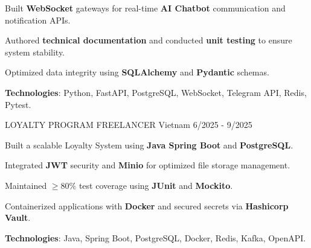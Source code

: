 \begin{cventries}
{\begin{cvitems}
        \item {Built \textbf{WebSocket} gateways for real-time \textbf{AI Chatbot} communication and notification APIs.}
        \item {Authored \textbf{technical documentation} and conducted \textbf{unit testing} to ensure system stability.}
        \item {Optimized data integrity using \textbf{SQLAlchemy} and \textbf{Pydantic} schemas.}
        \item {\textbf{Technologies}: Python, FastAPI, PostgreSQL, WebSocket, Telegram API, Redis, Pytest.}
      \end{cvitems}
    }

  \cventry
    {LOYALTY PROGRAM}
    {FREELANCER}
    {Vietnam}
    {6/2025 - 9/2025}
    {
      \begin{cvitems}
        \item {Built a scalable Loyalty System using \textbf{Java Spring Boot} and \textbf{PostgreSQL}.}
        \item {Integrated \textbf{JWT} security and \textbf{Minio} for optimized file storage management.}
        \item {Maintained \textbf{$\ge 80\%$} test coverage using \textbf{JUnit} and \textbf{Mockito}.}
        \item {Containerized applications with \textbf{Docker} and secured secrets via \textbf{Hashicorp Vault}.}
        \item {\textbf{Technologies}: Java, Spring Boot, PostgreSQL, Docker, Redis, Kafka, OpenAPI.}
      \end{cvitems}
    }

\end{cventries}
